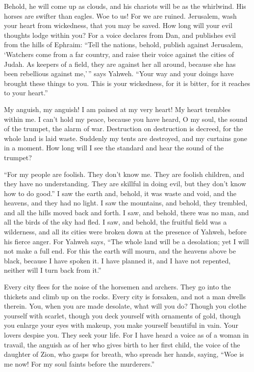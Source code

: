  Behold, he will come up as clouds, and his chariots will
be as the whirlwind. His horses are swifter than eagles. Woe to us! For
we are ruined.  Jerusalem, wash your heart from
wickedness, that you may be saved. How long will your evil thoughts
lodge within you?  For a voice declares from Dan, and
publishes evil from the hills of Ephraim:  ``Tell the
nations, behold, publish against Jerusalem, `Watchers come from a far
country, and raise their voice against the cities of Judah.
 As keepers of a field, they are against her all around,
because she has been rebellious against me,'\,'' says Yahweh.
 ``Your way and your doings have brought these things to
you. This is your wickedness, for it is bitter, for it reaches to your
heart.''

 My anguish, my anguish! I am pained at my very heart! My
heart trembles within me. I can't hold my peace, because you have heard,
O my soul, the sound of the trumpet, the alarm of war. 
Destruction on destruction is decreed, for the whole land is laid waste.
Suddenly my tents are destroyed, and my curtains gone in a moment.
 How long will I see the standard and hear the sound of
the trumpet?

 ``For my people are foolish. They don't know me. They
are foolish children, and they have no understanding. They are skillful
in doing evil, but they don't know how to do good.''  I
saw the earth and, behold, it was waste and void, and the heavens, and
they had no light.  I saw the mountains, and behold, they
trembled, and all the hills moved back and forth.  I saw,
and behold, there was no man, and all the birds of the sky had fled.
 I saw, and behold, the fruitful field was a wilderness,
and all its cities were broken down at the presence of Yahweh, before
his fierce anger.  For Yahweh says, ``The whole land will
be a desolation; yet I will not make a full end.  For
this the earth will mourn, and the heavens above be black, because I
have spoken it. I have planned it, and I have not repented, neither will
I turn back from it.''

 Every city flees for the noise of the horsemen and
archers. They go into the thickets and climb up on the rocks. Every city
is forsaken, and not a man dwells therein.  You, when you
are made desolate, what will you do? Though you clothe yourself with
scarlet, though you deck yourself with ornaments of gold, though you
enlarge your eyes with makeup, you make yourself beautiful in vain. Your
lovers despise you. They seek your life.  For I have
heard a voice as of a woman in travail, the anguish as of her who gives
birth to her first child, the voice of the daughter of Zion, who gasps
for breath, who spreads her hands, saying, ``Woe is me now! For my soul
faints before the murderers.''

